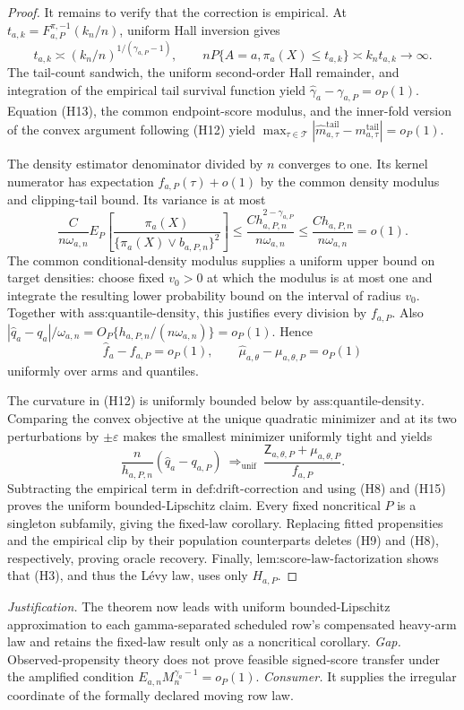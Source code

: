 \documentclass{article}
\begin{document}
\begin{proof}
It remains to verify that the correction is empirical.  At \(t_{a,k}=F_{a,P}^{\pi,-1}(k_n/n)\), uniform Hall inversion gives
\[
t_{a,k}\asymp(k_n/n)^{1/(\gamma_{a,P}-1)},
\qquad
nP\{A=a,\pi_a(X)\le t_{a,k}\}\asymp k_nt_{a,k}\to\infty.
\tag{H13}
\]
The tail-count sandwich, the uniform second-order Hall remainder, and integration of the empirical tail survival function yield \(\widehat\gamma_a-\gamma_{a,P}=o_P(1)\).  Equation (H13), the common endpoint-score modulus, and the inner-fold version of the convex argument following (H12) yield
\(\max_{\tau\in\mathcal T}|\widehat m^{\mathrm{tail}}_{a,\tau}-m^{\mathrm{tail}}_{a,\tau}|=o_P(1)\).

The density estimator denominator divided by \(n\) converges to one.  Its kernel numerator has expectation \(f_{a,P}(\tau)+o(1)\) by the common density modulus and clipping-tail bound.  Its variance is at most
\[
\frac C{n\omega_{a,n}}E_P\!\left[
\frac{\pi_a(X)}{\{\pi_a(X)\vee b_{a,P,n}\}^2}\right]
\le \frac{C h_{a,P,n}^{2-\gamma_{a,P}}}{n\omega_{a,n}}
\le \frac{C h_{a,P,n}}{n\omega_{a,n}}=o(1).
\tag{H14}
\]
The common conditional-density modulus supplies a uniform upper bound on target densities: choose fixed \(v_0>0\) at which the modulus is at most one and integrate the resulting lower probability bound on the interval of radius \(v_0\).  Together with \(\text{ass:quantile-density}\), this justifies every division by \(f_{a,P}\).  Also
\(|\widehat q_a-q_a|/\omega_{a,n}=O_P\{h_{a,P,n}/(n\omega_{a,n})\}=o_P(1)\).  Hence
\[
\widehat f_a-f_{a,P}=o_P(1),
\qquad
\widehat\mu_{a,\theta}-\mu_{a,\theta,P}=o_P(1)
\tag{H15}
\]
uniformly over arms and quantiles.

The curvature in (H12) is uniformly bounded below by \(\text{ass:quantile-density}\).  Comparing the convex objective at the unique quadratic minimizer and at its two perturbations by \(\pm\varepsilon\) makes the smallest minimizer uniformly tight and yields
\[
\frac n{h_{a,P,n}}(\widehat q_a-q_{a,P})
\ \Longrightarrow_{\mathrm{unif}}\ 
\frac{\mathsf Z_{a,\theta,P}+\mu_{a,\theta,P}}{f_{a,P}}.
\tag{H16}
\]
Subtracting the empirical term in \(\text{def:drift-correction}\) and using (H8) and (H15) proves the uniform bounded-Lipschitz claim.  Every fixed noncritical \(P\) is a singleton subfamily, giving the fixed-law corollary.  Replacing fitted propensities and the empirical clip by their population counterparts deletes (H9) and (H8), respectively, proving oracle recovery.  Finally, \(\text{lem:score-law-factorization}\) shows that (H3), and thus the Lévy law, uses only \(H_{a,P}\).
\end{proof}
\par\smallskip\noindent \textit{Justification.} The theorem now leads with uniform bounded-Lipschitz approximation to each gamma-separated scheduled row's compensated heavy-arm law and retains the fixed-law result only as a noncritical corollary. \textit{Gap.} Observed-propensity theory does not prove feasible signed-score transfer under the amplified condition \(E_{a,n}M_n^{\gamma_a-1}=o_P(1)\). \textit{Consumer.} It supplies the irregular coordinate of the formally declared moving row law.
\end{document}
